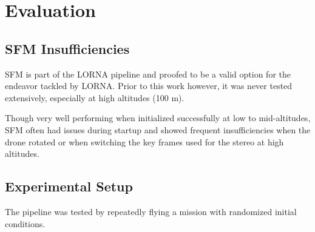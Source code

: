 \chapter{Evaluation}
\label{chapter:evaluation}



\section{SFM Insufficiencies}\label{subsec:sfm_insufficiencies}
SFM is part of the LORNA pipeline and proofed to be a valid option for the endeavor tackled by LORNA. Prior to this work however, it was never tested extensively, especially at high altitudes (100 m).

Though very well performing when initialized successfully at low to mid-altitudes, SFM often had issues during startup and showed frequent insufficiencies when the drone rotated or when switching the key frames used for the stereo at high altitudes.


\section{Experimental Setup}\label{sec:exp_setup}

The pipeline was tested by repeatedly flying a mission with randomized initial conditions.

